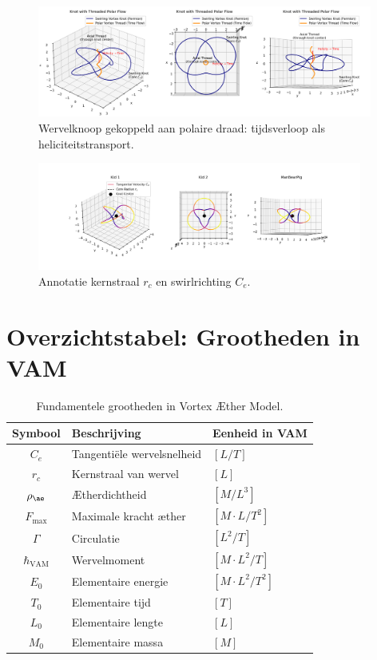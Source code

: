 \documentclass{article}
\begin{document}
    \begin{figure}[h!]
        \centering
        \includegraphics[width=0.98\textwidth]{KnotThreadedPolarFlow.png}
        \caption{Wervelknoop gekoppeld aan polaire draad: tijdsverloop als heliciteitstransport.}
    \end{figure}

    \begin{figure}[h!]
        \centering
        \includegraphics[width=0.95\textwidth]{vortex_knot_diagram.png}
        \caption{Annotatie kernstraal $r_c$ en swirlrichting $C_e$.}
    \end{figure}

    \section{Overzichtstabel: Grootheden in VAM}
    \begin{table}[h!]
        \centering
        \begin{tabular}{|c|l|l|}
            \hline
            \textbf{Symbool} & \textbf{Beschrijving} & \textbf{Eenheid in VAM} \\
            \hline
            $C_e$ & Tangentiële wervelsnelheid & $[L/T]$ \\
            $r_c$ & Kernstraal van wervel & $[L]$ \\
            $\rho_{\ae}$ & Ætherdichtheid & $[M/L^3]$ \\
            $F_{\text{max}}$ & Maximale kracht æther & $[M \cdot L/T^2]$ \\
            $\Gamma$ & Circulatie & $[L^2/T]$ \\
            $\hbar_{\text{VAM}}$ & Wervelmoment & $[M \cdot L^2 / T]$ \\
            $E_0$ & Elementaire energie & $[M \cdot L^2 / T^2]$ \\
            $T_0$ & Elementaire tijd & $[T]$ \\
            $L_0$ & Elementaire lengte & $[L]$ \\
            $M_0$ & Elementaire massa & $[M]$ \\
            \hline
        \end{tabular}
        \caption{Fundamentele grootheden in Vortex Æther Model.}
    \end{table}


    
    
    
    
    
    

    
    \printbibliography
\end{document}
